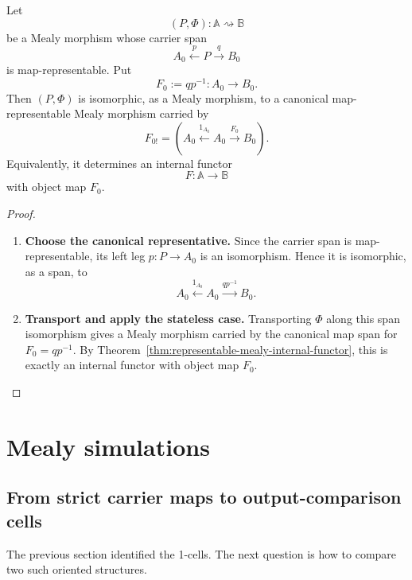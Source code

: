 \begin{corollary}
\label{cor:map-representable-mealy-internal-functor-up-to-iso}
    Let
    \[
        (P,\Phi):\mathbb A\rightsquigarrow\mathbb B
    \]
    be a Mealy morphism whose carrier span
    \[
        A_0\xleftarrow{p}P\xrightarrow{q}B_0
    \]
    is map-representable. Put
    \[
        F_0:=q p^{-1}:A_0\to B_0.
    \]
    Then \((P,\Phi)\) is isomorphic, as a Mealy morphism, to a canonical map-representable Mealy morphism carried by
    \[
        F_{0!}
        =
        \left(
            A_0
            \xleftarrow{1_{A_0}}
            A_0
            \xrightarrow{F_0}
            B_0
        \right).
    \]
    Equivalently, it determines an internal functor
    \[
        F:\mathbb A\to\mathbb B
    \]
    with object map \(F_0\).
\end{corollary}
\begin{proof}
    \leavevmode
    \begin{enumerate}
        \item \textbf{Choose the canonical representative.} Since the carrier span is map-representable, its left leg \(p:P\to A_0\) is an isomorphism. Hence it is isomorphic, as a span, to
        \[
            A_0\xleftarrow{1_{A_0}}A_0\xrightarrow{q p^{-1}}B_0.
        \]

        \item \textbf{Transport and apply the stateless case.} Transporting \(\Phi\) along this span isomorphism gives a Mealy morphism carried by the canonical map span for \(F_0=qp^{-1}\). By
        Theorem~\ref{thm:representable-mealy-internal-functor}, this is exactly an internal functor with object map \(F_0\).
    \end{enumerate}
\end{proof}

\section{Mealy simulations}
\label{sec:mealy-simulations}
\subsection{From strict carrier maps to output-comparison cells}
\label{subsec:strict-comparisons-output-comparisons}

The previous section identified the 1-cells. The next question is how to compare two such oriented structures.

